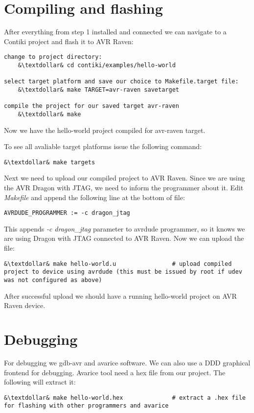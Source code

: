 \documentclass{article}
\begin{document}
\section{Compiling and flashing}
After everything from step 1 installed and connected we can navigate to a Contiki project and flash it to AVR Raven:
\begin{lstlisting}
change to project directory:
	&\textdollar& cd contiki/examples/hello-world
	
select target platform and save our choice to Makefile.target file:
	&\textdollar& make TARGET=avr-raven savetarget
	
compile the project for our saved target avr-raven
	&\textdollar& make
\end{lstlisting}
Now we have the hello-world project compiled for avr-raven target.

To see all avaliable target platforms issue the following command:
\begin{lstlisting}
&\textdollar& make targets
\end{lstlisting}

Next we need to upload our compiled project to AVR Raven.
Since we are using the AVR Dragon with JTAG, we need to inform the programmer about it.
Edit {\it{Makefile}} and append the following line at the bottom of file:
\begin{lstlisting}
AVRDUDE_PROGRAMMER := -c dragon_jtag
\end{lstlisting}

This appends {\it{-c dragon\_jtag}} parameter to avrdude programmer, so it knows we are using Dragon with JTAG connected to AVR Raven.
Now we can upload the file:
\begin{lstlisting}
&\textdollar& make hello-world.u                # upload compiled project to device using avrdude (this must be issued by root if udev was not configured as above)
\end{lstlisting}
After successful upload we should have a running hello-world project on AVR Raven device.


\section{Debugging}
For debugging we gdb-avr and avarice software. We can also use a DDD graphical frontend for debugging.
Avarice tool need a hex file from our project. The following will extract it:
\begin{lstlisting}
&\textdollar& make hello-world.hex              # extract a .hex file for flashing with other programmers and avarice
\end{lstlisting}
\end{document}
